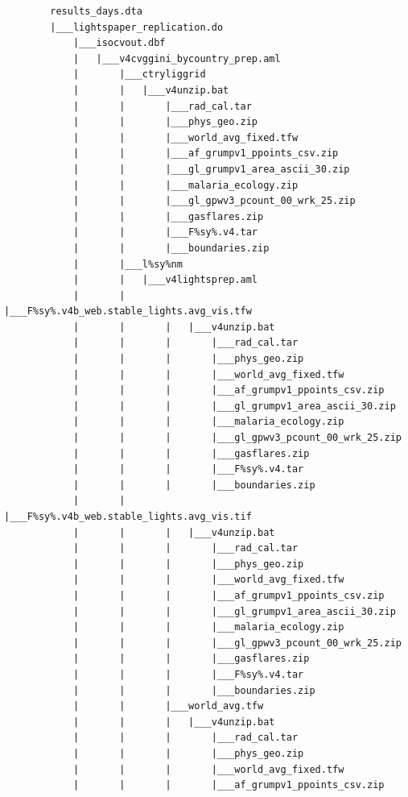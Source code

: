 \documentclass[
]{book}
\begin{document}
\begin{verbatim}
        results_days.dta
        |___lightspaper_replication.do
            |___isocvout.dbf
            |   |___v4cvggini_bycountry_prep.aml
            |       |___ctryliggrid
            |       |   |___v4unzip.bat
            |       |       |___rad_cal.tar
            |       |       |___phys_geo.zip
            |       |       |___world_avg_fixed.tfw
            |       |       |___af_grumpv1_ppoints_csv.zip
            |       |       |___gl_grumpv1_area_ascii_30.zip
            |       |       |___malaria_ecology.zip
            |       |       |___gl_gpwv3_pcount_00_wrk_25.zip
            |       |       |___gasflares.zip
            |       |       |___F%sy%.v4.tar
            |       |       |___boundaries.zip
            |       |___l%sy%nm
            |       |   |___v4lightsprep.aml
            |       |       |___F%sy%.v4b_web.stable_lights.avg_vis.tfw
            |       |       |   |___v4unzip.bat
            |       |       |       |___rad_cal.tar
            |       |       |       |___phys_geo.zip
            |       |       |       |___world_avg_fixed.tfw
            |       |       |       |___af_grumpv1_ppoints_csv.zip
            |       |       |       |___gl_grumpv1_area_ascii_30.zip
            |       |       |       |___malaria_ecology.zip
            |       |       |       |___gl_gpwv3_pcount_00_wrk_25.zip
            |       |       |       |___gasflares.zip
            |       |       |       |___F%sy%.v4.tar
            |       |       |       |___boundaries.zip
            |       |       |___F%sy%.v4b_web.stable_lights.avg_vis.tif
            |       |       |   |___v4unzip.bat
            |       |       |       |___rad_cal.tar
            |       |       |       |___phys_geo.zip
            |       |       |       |___world_avg_fixed.tfw
            |       |       |       |___af_grumpv1_ppoints_csv.zip
            |       |       |       |___gl_grumpv1_area_ascii_30.zip
            |       |       |       |___malaria_ecology.zip
            |       |       |       |___gl_gpwv3_pcount_00_wrk_25.zip
            |       |       |       |___gasflares.zip
            |       |       |       |___F%sy%.v4.tar
            |       |       |       |___boundaries.zip
            |       |       |___world_avg.tfw
            |       |       |   |___v4unzip.bat
            |       |       |       |___rad_cal.tar
            |       |       |       |___phys_geo.zip
            |       |       |       |___world_avg_fixed.tfw
            |       |       |       |___af_grumpv1_ppoints_csv.zip

\end{verbatim}
\end{document}
